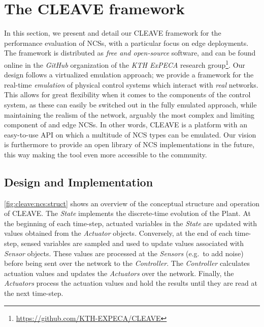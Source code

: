 \section{The \ac{CLEAVE} framework}\label{sec:approach}

In this section, we present and detail our \ac{CLEAVE} framework for the performance evaluation of \acfp{NCS}, with a particular focus on edge deployments.
The framework is distributed as \emph{free and open-source} software, and can be found online in the \emph{GitHub} organization of the \emph{KTH ExPECA} research group\footnote{\url{https://github.com/KTH-EXPECA/CLEAVE}}.
Our design follows a virtualized emulation approach; we provide a framework for the real-time \emph{emulation} of physical control systems which interact with \emph{real} networks.
This allows for great flexibility when it comes to the components of the control system, as these can easily be switched out in the fully emulated approach, while maintaining the realism of the network, arguably the most complex and limiting component of and edge \acp{NCS}.
In other words, \ac{CLEAVE} is a platform with an easy-to-use \ac{API} on which a multitude of \ac{NCS} types can be emulated.
Our vision is furthermore to provide an open library of \ac{NCS} implementations in the future, this way making the tool even more accessible to the community.


\subsection{Design and Implementation}

\cref{fig:cleave:ncs:struct} shows an overview of the conceptual structure and operation of \ac{CLEAVE}.
The \emph{State} implements the discrete-time evolution of the Plant.
At the beginning of each time-step, actuated variables in the \emph{State} are updated with values obtained from the \emph{Actuator} objects.
Conversely, at the end of each time-step, sensed variables are sampled and used to update values associated with \emph{Sensor} objects.
These values are processed at the \emph{Sensors} (e.g.\ to add noise) before being sent over the network to the \emph{Controller}.
The \emph{Controller} calculates actuation values and updates the \emph{Actuators} over the network.
Finally, the \emph{Actuators} process the actuation values and hold the results until they are read at the next time-step.

